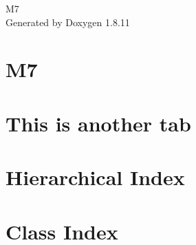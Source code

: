 \documentclass[twoside]{book}
\newcommand{\+}{\discretionary{\mbox{\scriptsize$\hookleftarrow$}}{}{}}
\newcommand{\clearemptydoublepage}{%
  \newpage{\pagestyle{empty}\cleardoublepage}%
}
\begin{document}
\hypersetup{pageanchor=false,
             bookmarksnumbered=true,
             pdfencoding=unicode
            }
\begin{titlepage}
\vspace*{7cm}
\begin{center}%
{\Large M7 }\\
\vspace*{1cm}
{\large Generated by Doxygen 1.8.11}\\
\end{center}
\end{titlepage}
\clearemptydoublepage
\tableofcontents
\clearemptydoublepage
{}
\hypersetup{pageanchor=true}

\chapter{M7}
\label{index}\hypertarget{index}{}
\chapter{This is another tab}
\label{md_wiki_overview}
\hypertarget{md_wiki_overview}{}

\chapter{Hierarchical Index}

\chapter{Class Index}

\end{document}

